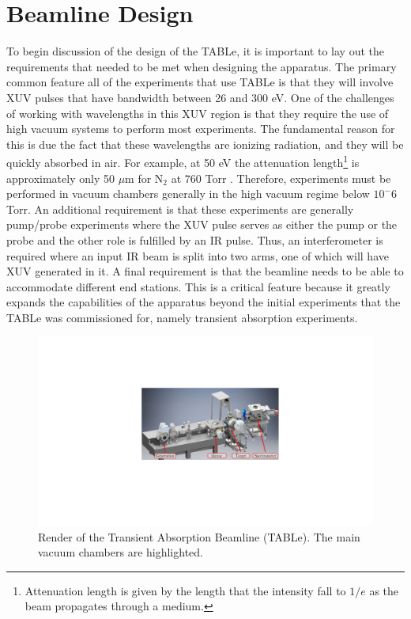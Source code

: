 \section{Beamline Design}
\label{sec:full_beamline}
To begin discussion of the design of the TABLe, it is important to lay out the requirements that needed to be met when designing the apparatus. The primary common feature all of the experiments that use TABLe is that they will involve XUV pulses that have bandwidth between 26 and 300 eV.  One of the challenges of working with wavelengths in this XUV region is that they require the use of high vacuum systems to perform most experiments.  The fundamental reason for this is due the fact that these wavelengths are ionizing radiation, and they will be quickly absorbed in air.  For example, at 50 eV the attenuation length\footnote{Attenuation length is given by the length that the intensity fall to $1/e$ as the beam propagates through a medium.} is approximately only 50 $\mu$m for N$_2$ at 760 Torr \cite{henkeLowenergyXrayInteraction1982}.  Therefore, experiments must be performed in vacuum chambers generally in the high vacuum regime below $10^-6$ Torr.  An additional requirement is that these experiments are generally pump/probe experiments where the XUV pulse serves as either the pump or the probe and the other role is fulfilled by an IR pulse.  Thus, an interferometer is required where an input IR beam is split into two arms, one of which will have XUV generated in it.  A final requirement is that the beamline needs to be able to accommodate different end stations.  This is a critical feature because it greatly expands the capabilities of the apparatus beyond the initial experiments that the TABLe was commissioned for, namely transient absorption experiments.
\begin{figure}
	\centering
	\includegraphics[width=1.0\textwidth]{figures/Beamline/CAD_beamline.pdf}
	\caption[Render of the TABLe]{Render of the Transient Absorption Beamline (TABLe).  The main vacuum chambers are highlighted.}
	\label{fig:CAD_render_TABLe}
\end{figure}

